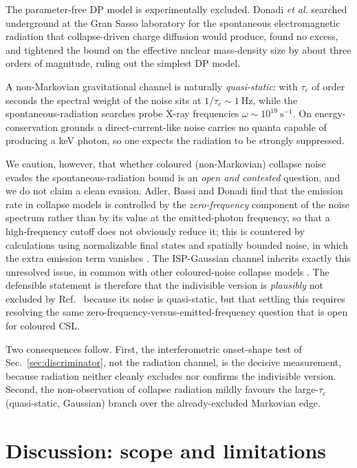 \documentclass[aps,pra,preprint,amsmath,amssymb,nofootinbib,superscriptaddress]{revtex4-2}
\begin{document}
The parameter-free DP model is experimentally excluded. Donadi \emph{et al.}
\cite{donadi2021} searched underground at the Gran Sasso laboratory for the
spontaneous electromagnetic radiation that collapse-driven charge diffusion would
produce, found no excess, and tightened the bound on the effective nuclear
mass-density size by about three orders of magnitude, ruling out the simplest DP
model.

A non-Markovian gravitational channel is naturally \emph{quasi-static}: with
$\tau_c$ of order seconds the spectral weight of the noise sits at
$1/\tau_c\sim1~$Hz, while the spontaneous-radiation searches probe X-ray
frequencies $\omega\sim10^{19}~\mathrm{s^{-1}}$. On energy-conservation grounds a
direct-current-like noise carries no quanta capable of producing a keV photon, so
one expects the radiation to be strongly suppressed.

We caution, however, that whether coloured (non-Markovian) collapse noise evades
the spontaneous-radiation bound is an \emph{open and contested} question, and we
do not claim a clean evasion. Adler, Bassi and Donadi \cite{adler2013} find that
the emission rate in collapse models is controlled by the \emph{zero-frequency}
component of the noise spectrum rather than by its value at the emitted-photon
frequency, so that a high-frequency cutoff does not obviously reduce it; this is
countered by calculations using normalizable final states and spatially bounded
noise, in which the extra emission term vanishes \cite{adler2013,carlesso2018}.
The ISP-Gaussian channel inherits exactly this unresolved issue, in common with
other coloured-noise collapse models \cite{carlesso2018}. The defensible
statement is therefore that the indivisible version is \emph{plausibly} not
excluded by Ref.~\cite{donadi2021} because its noise is quasi-static, but that
settling this requires resolving the same zero-frequency-versus-emitted-frequency
question that is open for coloured CSL.

Two consequences follow. First, the interferometric onset-shape test of
Sec.~\ref{sec:discriminator}, not the radiation channel, is the decisive
measurement, because radiation neither cleanly excludes nor confirms the
indivisible version. Second, the non-observation of collapse radiation mildly
favours the large-$\tau_c$ (quasi-static, Gaussian) branch over the
already-excluded Markovian edge.

\section{Discussion: scope and limitations}
\label{sec:scope}
\end{document}
